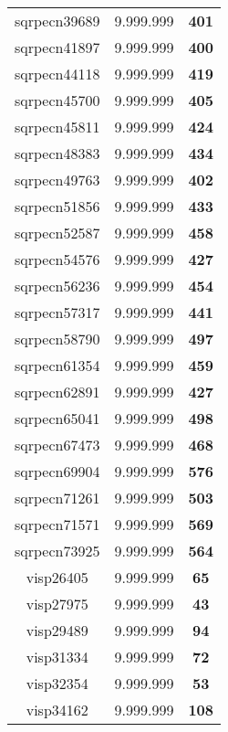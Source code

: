 \begin{tabular}{cc||c}
sqrpecn39689     & 9.999.999        & {\bf 401}       \\ 
sqrpecn41897     & 9.999.999        & {\bf 400}       \\ 
sqrpecn44118     & 9.999.999        & {\bf 419}       \\ 
sqrpecn45700     & 9.999.999        & {\bf 405}       \\ 
sqrpecn45811     & 9.999.999        & {\bf 424}       \\ 
sqrpecn48383     & 9.999.999        & {\bf 434}       \\ 
sqrpecn49763     & 9.999.999        & {\bf 402}       \\ 
sqrpecn51856     & 9.999.999        & {\bf 433}       \\ 
sqrpecn52587     & 9.999.999        & {\bf 458}       \\ 
sqrpecn54576     & 9.999.999        & {\bf 427}       \\ 
sqrpecn56236     & 9.999.999        & {\bf 454}       \\ 
sqrpecn57317     & 9.999.999        & {\bf 441}       \\ 
sqrpecn58790     & 9.999.999        & {\bf 497}       \\ 
sqrpecn61354     & 9.999.999        & {\bf 459}       \\ 
sqrpecn62891     & 9.999.999        & {\bf 427}       \\ 
sqrpecn65041     & 9.999.999        & {\bf 498}       \\ 
sqrpecn67473     & 9.999.999        & {\bf 468}       \\ 
sqrpecn69904     & 9.999.999        & {\bf 576}       \\ 
sqrpecn71261     & 9.999.999        & {\bf 503}       \\ 
sqrpecn71571     & 9.999.999        & {\bf 569}       \\ 
sqrpecn73925     & 9.999.999        & {\bf 564}       \\ 
visp26405        & 9.999.999        & {\bf 65}        \\ 
visp27975        & 9.999.999        & {\bf 43}        \\ 
visp29489        & 9.999.999        & {\bf 94}        \\ 
visp31334        & 9.999.999        & {\bf 72}        \\ 
visp32354        & 9.999.999        & {\bf 53}        \\ 
visp34162        & 9.999.999        & {\bf 108}       \\ 

\end{tabular}
